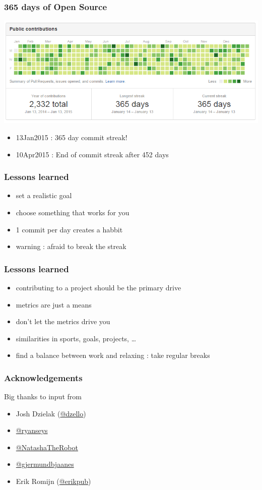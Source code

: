 \documentclass[14pt]{beamer}
\begin{document}
  \begin{frame}
    \frametitle{365 days of Open Source}
    \includegraphics[scale=.45]{github_oss365_13jan2015.png}
    \begin{itemize}
      \item 13Jan2015 : 365 day commit streak!
      \item 10Apr2015 : End of commit streak after 452 days
    \end{itemize}
  \end{frame}
  \begin{frame}
    \frametitle{Lessons learned}
    \begin{itemize}
      \item set a realistic goal
      \item choose something that works for you
      \item 1 commit per day creates a habbit
      \item warning : afraid to break the streak
    \end{itemize}
  \end{frame}
  \begin{frame}
    \frametitle{Lessons learned}
    \begin{itemize}
      \item contributing to a project should be the primary drive
      \item metrics are just a means
      \item don't let the metrics drive you
      \item similarities in sports, goals, projects, \ldots
      \item find a balance between work and relaxing : take regular breaks
    \end{itemize}
  \end{frame}
  \begin{frame}
    \frametitle{Acknowledgements}
    Big thanks to input from
    \begin{itemize}
      \item Josh Dzielak (\href{https://twitter.com/dzello}{@dzello})
      \item \href{https://twitter.com/ryanseys}{@ryanseys}
      \item \href{https://twitter.com/natashatherobot}{@NatashaTheRobot}
      \item \href{https://twitter.com/gjermundbjaanes}{@gjermundbjaanes}
      \item Erik Romijn (\href{https://twitter.com/erikpub}{@erikpub})
    \end{itemize}
  \end{frame}
\end{document}
